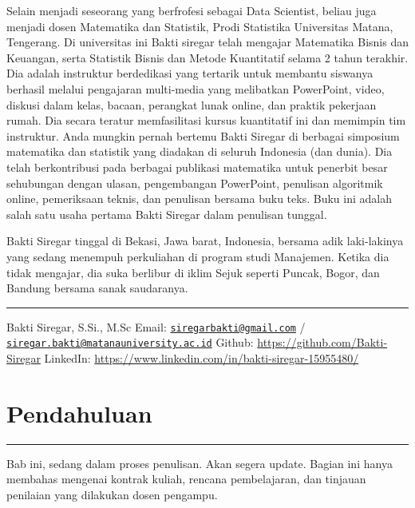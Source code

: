 \documentclass[
]{book}
\begin{document}
Selain menjadi seseorang yang berfrofesi sebagai Data Scientist, beliau juga menjadi dosen Matematika dan Statistik, Prodi Statistika Universitas Matana, Tengerang. Di universitas ini Bakti siregar telah mengajar Matematika Bisnis dan Keuangan, serta Statistik Bisnis dan Metode Kuantitatif selama 2 tahun terakhir. Dia adalah instruktur berdedikasi yang tertarik untuk membantu siswanya berhasil melalui pengajaran multi-media yang melibatkan PowerPoint, video, diskusi dalam kelas, bacaan, perangkat lunak online, dan praktik pekerjaan rumah. Dia secara teratur memfasilitasi kursus kuantitatif ini dan memimpin tim instruktur. Anda mungkin pernah bertemu Bakti Siregar di berbagai simposium matematika dan statistik yang diadakan di seluruh Indonesia (dan dunia). Dia telah berkontribusi pada berbagai publikasi matematika untuk penerbit besar sehubungan dengan ulasan, pengembangan PowerPoint, penulisan algoritmik online, pemeriksaan teknis, dan penulisan bersama buku teks. Buku ini adalah salah satu usaha pertama Bakti Siregar dalam penulisan tunggal.

Bakti Siregar tinggal di Bekasi, Jawa barat, Indonesia, bersama adik laki-lakinya yang sedang menempuh perkuliahan di program studi Manajemen. Ketika dia tidak mengajar, dia suka berlibur di iklim Sejuk seperti Puncak, Bogor, dan Bandung bersama sanak saudaranya.

\begin{center}\rule{0.5\linewidth}{0.5pt}\end{center}

Bakti Siregar, S.Si., M.Sc
Email: \href{mailto:siregarbakti@gmail.com}{\nolinkurl{siregarbakti@gmail.com}} / \href{mailto:siregar.bakti@matanauniversity.ac.id}{\nolinkurl{siregar.bakti@matanauniversity.ac.id}}
Github: \url{https://github.com/Bakti-Siregar}
LinkedIn: \url{https://www.linkedin.com/in/bakti-siregar-15955480/}

\hypertarget{Pendahuluan}{%
\chapter{Pendahuluan}\label{Pendahuluan}}

\begin{center}\rule{0.5\linewidth}{0.5pt}\end{center}

Bab ini, sedang dalam proses penulisan. Akan segera update. Bagian ini hanya membahas mengenai kontrak kuliah, rencana pembelajaran, dan tinjauan penilaian yang dilakukan dosen pengampu.
\end{document}
